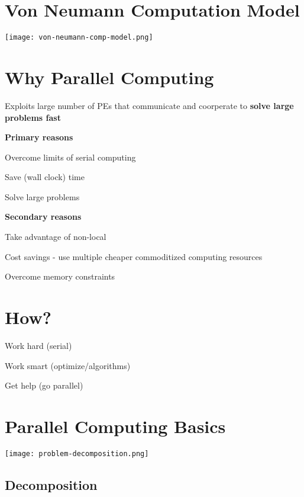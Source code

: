 \documentclass[12pt]{article}
\begin{document}
\begin{spacing}{1.5}
\section{Von Neumann Computation Model}

\texttt{[image: von-neumann-comp-model.png]}

\section{Why Parallel Computing}

Exploits large number of PEs that communicate and coorperate to \textbf{solve large problems fast}

\textbf{Primary reasons}

\begin{itemize*}
	\item Overcome limits of serial computing
	\item Save (wall clock) time
	\item Solve large problems
\end{itemize*}

\textbf{Secondary reasons}

\begin{itemize*}
	\item Take advantage of non-local 
	\item Cost savings - use multiple cheaper commoditized computing resources
	\item Overcome memory constraints
\end{itemize*}

\section{How?}

\begin{itemize*}
	\item Work hard (serial)
	\item Work smart (optimize/algorithms)
	\item Get help (go parallel) 
\end{itemize*}

\section{Parallel Computing Basics}

\texttt{[image: problem-decomposition.png]}

\subsection{Decomposition}


\end{spacing}
\end{document}
